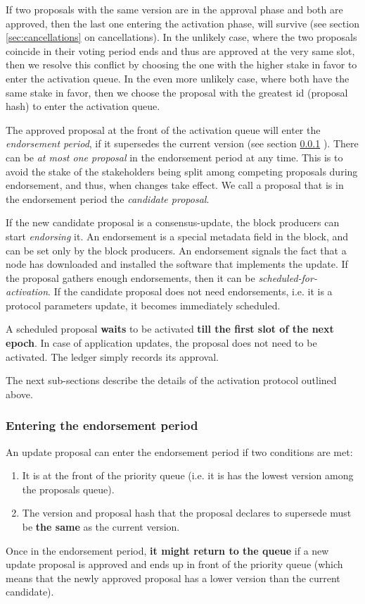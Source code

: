 
If two proposals with the same version are in the approval phase and both are 
approved, then the last one entering the activation phase, will survive (see 
section \ref{sec:cancellations} on cancellations). In the unlikely case, where 
the two proposals coincide in their voting period ends and thus are approved at 
the very same slot, then we resolve this conflict by choosing the one with the 
higher stake in favor to enter the activation queue. In the even more unlikely 
case, where both have the same stake in favor, then we choose the proposal with 
the greatest id (proposal hash) to enter the activation queue.

The approved proposal at the front of the activation queue will enter the
\emph{endorsement period}, if it supersedes the current version (see section 
\ref{sec:entering-the-endorsement-phase} ).
%
There can be \emph{at most one proposal} in the endorsement period at any time.
%
This is to avoid the stake of the stakeholders being split among competing
proposals during endorsement, and thus, when changes take effect.
%
We call a proposal that is in the endorsement period the \emph{candidate
  proposal}.

If the new candidate proposal is a consensus-update, the block producers can
start \emph{endorsing} it. An endorsement is a special metadata field in the
block, and can be set only by the block producers. An endorsement signals the
fact that a node has downloaded and installed the software that implements the
update.
%
If the proposal gathers enough endorsements, then it can be
\emph{scheduled-for-activation}.
%
If the candidate proposal does not need endorsements, i.e. it is a protocol
parameters update, it becomes immediately scheduled.

A scheduled proposal \textbf{waits} to be activated \textbf{till the first slot
  of the next epoch}. In case of application updates, the proposal does not need
to be activated. The ledger simply records its approval.

The next sub-sections describe the details of the activation protocol outlined
above.

\subsubsection{Entering the endorsement period}
\label{sec:entering-the-endorsement-phase}

An update proposal can enter the endorsement period if two conditions are met:
\begin{enumerate}
\item It is at the front of the priority queue (i.e. it is has the lowest
  version among the proposals queue).
\item The version and proposal hash that the proposal declares to supersede must
  be \textbf{the same} as the current version.
\end{enumerate}
Once in the endorsement period, \textbf{it might return to the queue} if a new
update proposal is approved and ends up in front of the priority queue (which
means that the newly approved proposal has a lower version than the current
candidate).

